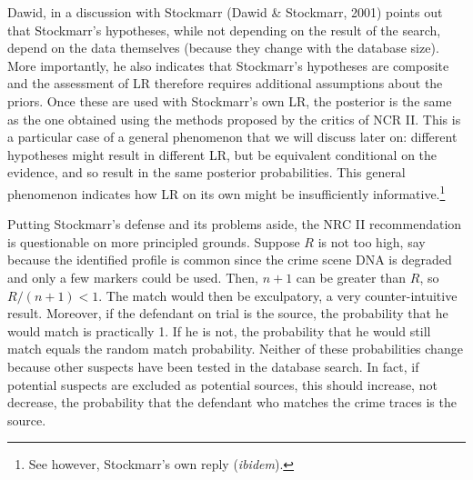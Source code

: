 \documentclass[
  10pt,
  dvipsnames,enabledeprecatedfontcommands]{scrartcl}
\begin{document}
Dawid, in a discussion with Stockmarr (Dawid \& Stockmarr, 2001) points
out that Stockmarr's hypotheses, while not depending on the result of
the search, depend on the data themselves (because they change with the
database size). More importantly, he also indicates that Stockmarr's
hypotheses are composite and the assessment of LR therefore requires
additional assumptions about the priors. Once these are used with
Stockmarr's own LR, the posterior is the same as the one obtained using
the methods proposed by the critics of NCR II. This is a particular case
of a general phenomenon that we will discuss later on: different
hypotheses might result in different LR, but be equivalent conditional
on the evidence, and so result in the same posterior probabilities. This
general phenomenon indicates how LR on its own might be insufficiently
informative.\footnote{See however, Stockmarr's own reply
  (\emph{ibidem}).}

Putting Stockmarr's defense and its problems aside, the NRC II
recommendation is questionable on more principled grounds. Suppose \(R\)
is not too high, say because the identified profile is common since the
crime scene DNA is degraded and only a few markers could be used. Then,
\(n+1\) can be greater than \(R\), so \(R/(n+1)<1\). The match would
then be exculpatory, a very counter-intuitive result. Moreover, if the
defendant on trial is the source, the probability that he would match is
practically 1. If he is not, the probability that he would still match
equals the random match probability. Neither of these probabilities
change because other suspects have been tested in the database search.
In fact, if potential suspects are excluded as potential sources, this
should increase, not decrease, the probability that the defendant who
matches the crime traces is the source.
\end{document}
